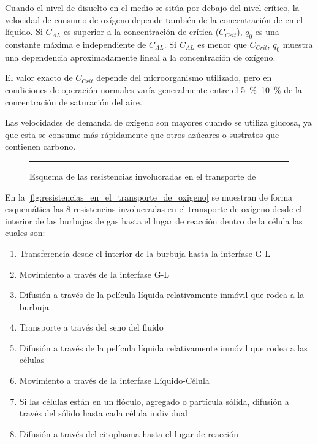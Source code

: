 \documentclass{AsignaturaResumen}
\begin{document}

Cuando el nivel de  disuelto en el medio se sitúa por debajo del nivel crítico, la velocidad de consumo de oxígeno depende también de la concentración de  en el líquido. Si $C_{AL}$ es superior a la concentración de  crítica ($C_{Crit}$), $q_{0}$ es una constante máxima e independiente de $C_{AL}$. Si $C_{AL}$ es menor que $C_{Crit}$, $q_{0}$ muestra una dependencia aproximadamente lineal a la concentración de oxígeno.

El valor exacto de $C_{Crit}$ depende del microorganismo utilizado, pero en condiciones de operación normales varía generalmente entre el \qtyrange{5}{10}{\percent} de la concentración de saturación del aire.

Las velocidades de demanda de oxígeno son mayores cuando se utiliza glucosa, ya que esta se consume más rápidamente que otros azúcares o sustratos que contienen carbono.

\begin{figure}\centering
    \resizebox{\linewidth}{!}{}
    \rule{\linewidth}{0.5pt}
    \caption{Esquema de las resistencias involucradas en el transporte de }
    \label{fig:resistencias_en_el_transporte_de_oxigeno}
\end{figure}

En la \autoref{fig:resistencias_en_el_transporte_de_oxigeno} se muestran de forma esquemática las 8 resistencias involucradas en el transporte de oxígeno desde el interior de las burbujas de gas hasta el lugar de reacción dentro de la célula las cuales son:

\begin{enumerate}
    \item Transferencia desde el interior de la burbuja hasta la interfase G-L
    \item Movimiento a través de la interfase G-L
    \item Difusión a través de la película líquida relativamente inmóvil que rodea a la burbuja
    \item Transporte a través del seno del fluido
    \item Difusión a través de la película líquida relativamente inmóvil que rodea a las células
    \item Movimiento a través de la interfase Líquido-Célula
    \item Si las células están en un flóculo, agregado o partícula sólida, difusión a través del sólido hasta cada célula individual
    \item Difusión a través del citoplasma hasta el lugar de reacción
\end{enumerate}
\end{document}
